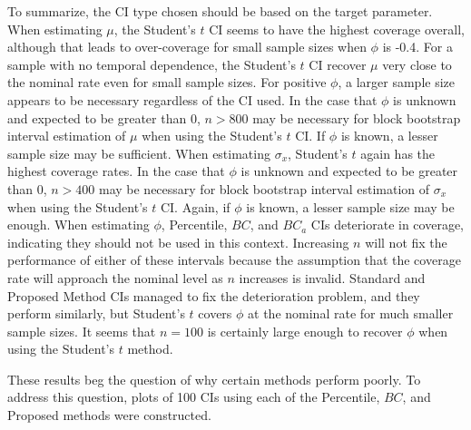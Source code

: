 \documentclass[12pt, letterpaper, titlepage]{article}
\begin{document}
To summarize, the CI type chosen should be based on the target parameter. 
When estimating $\mu$, the Student's $t$ CI seems to have the highest
 coverage
overall, although that leads to over-coverage for small sample sizes when $\phi$
 is -0.4. For a
sample with no temporal dependence, the Student's $t$ CI recover $\mu$ 
very close to the nominal rate even for small sample sizes. For positive $\phi$, a
larger sample size appears to be necessary regardless of the CI used. In the
case that $\phi$ is unknown and expected to be greater than $0$, $n > 800$
may be
necessary for block bootstrap interval estimation of $\mu$ when using the Student's $t$ CI. If $\phi$ is known,
a lesser sample size may be sufficient. When estimating $\sigma_x$,
Student's $t$ again has the highest coverage
rates. In the case that $\phi$ is unknown and expected to be greater than $0$,
$n > 400$ may be necessary for block bootstrap interval estimation of
$\sigma_x$ when using the Student's $t$ CI. Again, if $\phi$ is known, a lesser sample size may be enough.
When estimating $\phi$, Percentile, $BC$, and $BC_a$ CIs 
deteriorate in coverage, indicating they should not be used in this context. 
Increasing $n$ will not fix the performance of either of these intervals 
because the assumption that the coverage rate will approach the nominal level
as $n$ increases is invalid. Standard and Proposed Method CIs managed to fix the
deterioration problem, and they perform similarly, but Student's $t$ covers
$\phi$ at the nominal rate for much smaller sample sizes. It seems that 
$n = 100$ is certainly large enough to
recover $\phi$ when using the Student's $t$ method.

These results beg the question of why certain methods perform poorly. To address 
this question, plots of 100 CIs using each of the Percentile, $BC$, and Proposed 
methods were constructed. 
\end{document}
